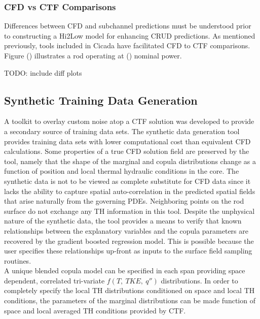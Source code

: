 \subsubsection*{CFD vs CTF Comparisons}

Differences between CFD and subchannel predictions must be understood prior to constructing a Hi2Low model for enhancing CRUD predictions.  As mentioned previously, tools included in Cicada have facilitated CFD to CTF comparisons.  Figure () illustrates a rod operating at () nominal power.

TODO: include diff plots

\subsection{Synthetic Training Data Generation}
\label{chap:synth}

A toolkit to overlay custom noise atop a CTF solution was developed to provide a secondary source of training data sets.  The synthetic data generation tool provides training data sets with lower computational cost than equivalent CFD calculations.  Some properties of a true CFD solution field are preserved by the tool, namely that the shape of the marginal and copula distributions change as a function of position and local thermal hydraulic conditions in the core.  The synthetic data is not to be viewed as complete substitute for CFD data since it lacks the ability to capture spatial auto-correlation in the predicted spatial fields that arise naturally from the governing PDEs.  Neighboring points on the rod surface do not exchange any TH information in this tool.  Despite the unphysical nature of the synthetic data, the tool provides a means to verify that known relationships between the explanatory variables and the copula parameters are recovered by the gradient boosted regression model.  This is possible because the user specifies these relationships up-front as inputs to the surface field sampling routines. \\

A unique blended copula model can be specified in each span providing space dependent, correlated tri-variate $f(T,\ TKE,\ q'')$  distributions.
In order to completely specify the local TH distributions conditioned on space and local TH conditions, the parameters of the marginal distributions can be made function of space and local averaged TH conditions provided by CTF.  


